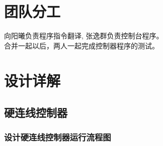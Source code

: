 \documentclass[UTF8]{ctexart}
\begin{document}
\section{团队分工}
向阳曦负责程序指令翻译, 张逸群负责控制台程序。\\
合并一起以后，两人一起完成控制器程序的测试。
\section{设计详解}
\subsection{硬连线控制器}
\subsubsection{设计硬连线控制器运行流程图}
\end{document}
